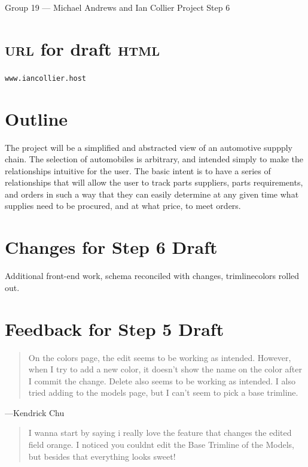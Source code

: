 \documentclass[11pt,letterpaper,oneside]{amsart}
\begin{document}
Group 19 --- Michael Andrews and Ian Collier
Project Step 6

\section*{\textsc{url} for draft \textsc{html}}

\texttt{www.iancollier.host}

\section*{Outline}

The project will be a simplified and abstracted view of an automotive suppply chain.  The selection of automobiles is arbitrary, and intended simply to make the relationships intuitive for the user.  The basic intent is to have a series of relationships that will allow the user to track parts suppliers, parts requirements, and orders in such a way that they can easily determine at any given time what supplies need to be procured, and at what price, to meet orders.

\section*{Changes for Step 6 Draft}

Additional front-end work, schema reconciled with changes, trimline\textunderscore colors rolled out.

\section*{Feedback for Step 5 Draft}

\begin{quotation}
On the colors page, the edit seems to be working as intended.  However, when I try to add a new color, it doesn't show the name on the color after I commit the change.  Delete also seems to be working as intended.  I also tried adding to the models page, but I can't seem to pick a base trimline.
\end{quotation}

---Kendrick Chu

\begin{quotation}
I wanna start by saying i really love the feature that changes the edited field orange. I noticed you couldnt edit the Base Trimline of the Models, but besides that everything looks sweet!
\end{quotation}
\end{document}
